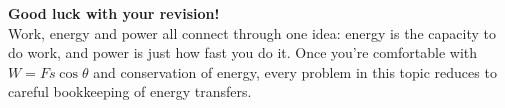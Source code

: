 \vspace{1em}
\begin{motivationbox}
\centering
\textbf{\color{darkblue}Good luck with your revision!}\\[0.2em]
{\color{darkgray}\small Work, energy and power all connect through one idea: energy is the capacity to do work, and power is just how fast you do it. Once you're comfortable with $W = Fs\cos\theta$ and conservation of energy, every problem in this topic reduces to careful bookkeeping of energy transfers.}
\end{motivationbox}

